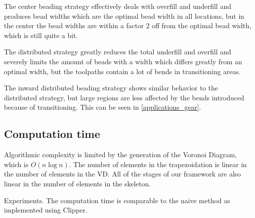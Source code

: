 The center beading strategy effectively deals with overfill and underfill and produces bead widths which are the optimal bead width in all locations, but in the center the bead widths are within a factor 2 off from the optimal bead width, which is still quite a bit.

The distributed strategy greatly reduces the total underfill and overfill and severely limits the amount of beads with a width which differs greatly from an optimal width, but the toolpaths contain a lot of bends in transitioning areas.

The inward distributed beading strategy shows similar behavior to the distributed strategy, but large regions are less affected by the bends introduced because of transitioning.
This can be seen in \cref{applications_gear}.



\subsection{Computation time}
Algorithmic complexity is limited by the generation of the Voronoi Diagram, which is $O(n \log n)$.
The number of elements in the trapezoidation is linear in the number of elements in the VD.
All of the stages of our framework are also linear in the number of elements in the skeleton.

Experiments.
The computation time is comparable to the naive method as implemented using Clipper.